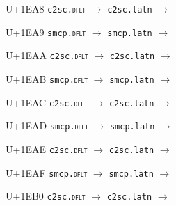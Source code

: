 \documentclass{article}
\begin{document}
\begin{substitutions}
\goodbreak

U+1EA8  \linebreak
    \texttt{c2sc.\textsc{dflt}} $\to$  \linebreak
    \texttt{c2sc.latn} $\to$  

\goodbreak

U+1EA9  \linebreak
    \texttt{smcp.\textsc{dflt}} $\to$  \linebreak
    \texttt{smcp.latn} $\to$  

\goodbreak

U+1EAA  \linebreak
    \texttt{c2sc.\textsc{dflt}} $\to$  \linebreak
    \texttt{c2sc.latn} $\to$  

\goodbreak

U+1EAB  \linebreak
    \texttt{smcp.\textsc{dflt}} $\to$  \linebreak
    \texttt{smcp.latn} $\to$  

\goodbreak

U+1EAC  \linebreak
    \texttt{c2sc.\textsc{dflt}} $\to$  \linebreak
    \texttt{c2sc.latn} $\to$  

\goodbreak

U+1EAD  \linebreak
    \texttt{smcp.\textsc{dflt}} $\to$  \linebreak
    \texttt{smcp.latn} $\to$  

\goodbreak

U+1EAE  \linebreak
    \texttt{c2sc.\textsc{dflt}} $\to$  \linebreak
    \texttt{c2sc.latn} $\to$  

\goodbreak

U+1EAF  \linebreak
    \texttt{smcp.\textsc{dflt}} $\to$  \linebreak
    \texttt{smcp.latn} $\to$  

\goodbreak

U+1EB0  \linebreak
    \texttt{c2sc.\textsc{dflt}} $\to$  \linebreak
    \texttt{c2sc.latn} $\to$  


\end{substitutions}
\end{document}
